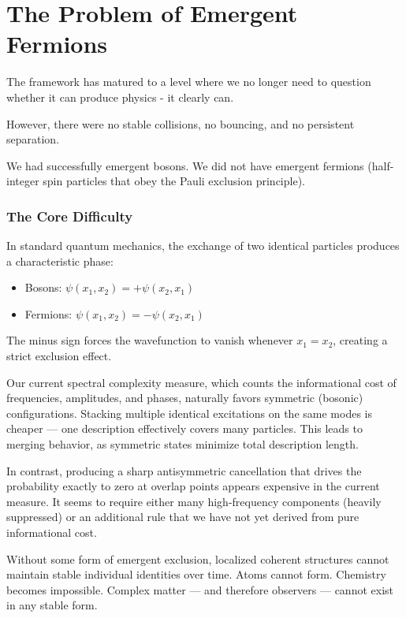 \chapter{The Problem of Emergent Fermions}
\label{chap:problem-of-emergent-fermions}

The framework has matured to a level where we no longer need to question whether it can produce physics - it clearly can. 

However, there were no stable collisions, no bouncing, and no persistent separation.

We had successfully emergent bosons. We did not have emergent fermions (half-integer spin particles that
obey the Pauli exclusion principle).

\subsection*{The Core Difficulty}

In standard quantum mechanics, the exchange of two identical particles produces a characteristic phase:
\begin{itemize}
    \item Bosons: \(\psi(x_1, x_2) = +\psi(x_2, x_1)\)
    \item Fermions: \(\psi(x_1, x_2) = -\psi(x_2, x_1)\)
\end{itemize}

The minus sign forces the wavefunction to vanish whenever \(x_1 = x_2\), creating a strict exclusion effect.

Our current spectral complexity measure, which counts the informational cost of frequencies, amplitudes, and phases, naturally favors symmetric (bosonic) configurations.
Stacking multiple identical excitations on the same modes is cheaper — one description effectively covers many particles.
This leads to merging behavior, as symmetric states minimize total description length.

In contrast, producing a sharp antisymmetric cancellation that drives the probability exactly to zero at overlap points appears expensive in the current measure.
It seems to require either many high-frequency components (heavily suppressed) or an additional rule that we have not yet derived from pure informational cost.

Without some form of emergent exclusion, localized coherent structures cannot maintain stable individual identities over time.
Atoms cannot form. Chemistry becomes impossible. Complex matter — and therefore observers — cannot exist in any stable form.


